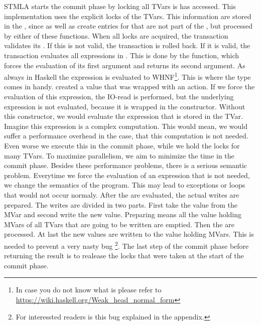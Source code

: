 STMLA starts the commit phase by locking all TVars is has accessed. This implementation 
uses the explicit locks of the TVars. This information are 
stored in the , since  as well as  create
entries for that are not part of the , but processed by either of these 
functions. When all locks are acquired, the transaction validates its .
If this is not valid, the transaction is rolled back.
If it is valid, the transaction evaluates all expressions in . This is done
by the  function, which forces the evaluation of its first argument and returns 
its second argument. As always in Haskell the expression is evaluated to WHNF\footnote{In 
case you do not know what  is please refer to 
\url{https://wiki.haskell.org/Weak_head_normal_form}}. This is where the  type 
comes in handy.  created a  value that was wrapped with an
 action. If we force the evaluation of this expression, the 
IO-read is performed, but the underlying expression is not evaluated, because it is wrapped 
in the  constructor. Without this constructor, we would evaluate the expression that 
is stored in the TVar. Imagine this expression is a complex computation. This would mean, we 
would suffer a performance overhead in the case, that this computation is not needed. 
Even worse we execute this in the commit phase, while we hold the locks for many TVars.
To maximize parallelism, we aim to minimize the time in the commit phase. Besides these
performance problems, there is a serious semantic problem. Everytime we force the 
evaluation of an expression that is not needed, we change the semantics of the program.
This may lead to exceptions or loops that would not occur normaly.
After the  are evaluated, the actual writes are prepared. The writes are 
divided in two parts. First take the value from the MVar and second write the new value.
Preparing means all the value holding MVars of all TVars that are going to be written
are emptied. Then the  are processed. At last the new values are written
to the value holding MVars. This is needed to prevent a very nasty bug \footnote{For 
interessted readers is this bug explained in the appendix.}. 
The last step of the commit phase before returning the result is to realease the locks
that were taken at the start of the commit phase.

